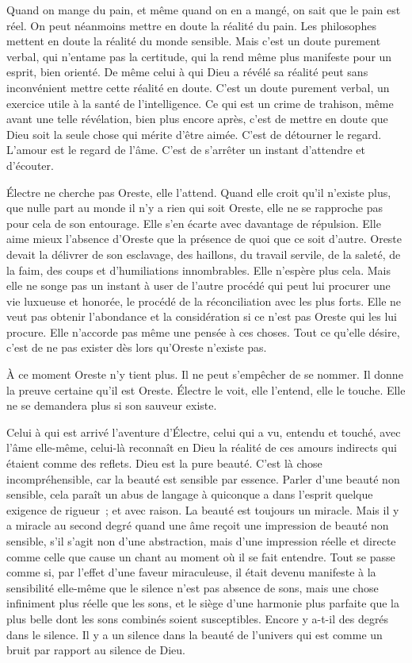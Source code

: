 \documentclass[french,twoside]{book} %
\begin{document}
Quand on mange du pain, et même quand on en a mangé, on sait que le pain est réel. On peut néanmoins mettre en doute la réalité du pain. Les philosophes mettent en doute la réalité du monde sensible. Mais c'est un doute purement verbal, qui n'entame pas la certitude, qui la rend même plus manifeste pour un esprit, bien orienté. De même celui à qui Dieu a révélé sa réalité peut sans inconvénient mettre cette réalité en doute. C'est un doute purement verbal, un exercice utile à la santé de l'intelligence. Ce qui est un crime de trahison, même avant une telle révélation, bien plus encore après, c'est de mettre en doute que Dieu soit la seule chose qui mérite d'être aimée. C'est de détourner le regard. L'amour est le regard de l'âme. C'est de s'arrêter un instant d'attendre et d'écouter.\par
Électre ne cherche pas Oreste, elle l'attend. Quand elle croit qu'il n'existe plus, que nulle part au monde il n'y a rien qui soit Oreste, elle ne se rapproche pas pour cela de son entourage. Elle s'en écarte avec davantage de répulsion. Elle aime mieux l'absence d'Oreste que la présence de quoi que ce soit d'autre. Oreste devait la délivrer de son esclavage, des haillons, du travail servile, de la saleté, de la faim, des coups et d'humiliations innombrables. Elle n'espère plus cela. Mais elle ne songe pas un instant à user de l'autre procédé qui peut lui procurer une vie luxueuse et honorée, le procédé de la réconciliation avec les plus forts. Elle ne veut pas obtenir l'abondance et la considération si ce n'est pas Oreste qui les lui procure. Elle n'accorde pas même une pensée à ces choses. Tout ce qu'elle désire, c'est de ne pas exister dès lors qu'Oreste n'existe pas.\par
À ce moment Oreste n'y tient plus. Il ne peut s'empêcher de se nommer. Il donne la preuve certaine qu'il est Oreste. Électre le voit, elle l'entend, elle le touche. Elle ne se demandera plus si son sauveur existe.\par
Celui à qui est arrivé l'aventure d'Électre, celui qui a vu, entendu et touché, avec l'âme elle-même, celui-là reconnaît en Dieu la réalité de ces amours indirects qui étaient comme des reflets. Dieu est la pure beauté. C'est là chose incompréhensible, car la beauté est sensible par essence. Parler d'une beauté non sensible, cela paraît un abus de langage à quiconque a dans l'esprit quelque exigence de rigueur ; et avec raison. La beauté est toujours un miracle. Mais il y a miracle au second degré quand une âme reçoit une impression de beauté non sensible, s'il s'agit non d'une abstraction, mais d'une impression réelle et directe comme celle que cause un chant au moment où il se fait entendre. Tout se passe comme si, par l'effet d'une faveur miraculeuse, il était devenu manifeste à la sensibilité elle-même que le silence n'est pas absence de sons, mais une chose infiniment plus réelle que les sons, et le siège d'une harmonie plus parfaite que la plus belle dont les sons combinés soient susceptibles. Encore y a-t-il des degrés dans le silence. Il y a un silence dans la beauté de l'univers qui est comme un bruit par rapport au silence de Dieu.\par
\end{document}
